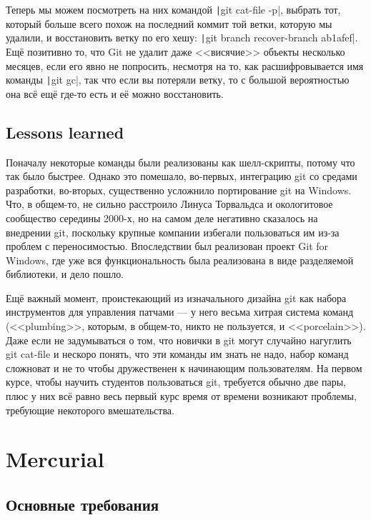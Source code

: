\documentclass[a5paper]{article}
\begin{document}
Теперь мы можем посмотреть на них командой \texttt|git cat-file -p|, выбрать тот, который больше всего похож на последний коммит той ветки, которую мы удалили, и восстановить ветку по его хешу: \texttt|git branch recover-branch ab1afef|. Ещё позитивно то, что Git не удалит даже <<висячие>> объекты несколько месяцев, если его явно не попросить, несмотря на то, как расшифровывается имя команды \texttt|git gc|, так что если вы потеряли ветку, то с большой вероятностью она всё ещё где-то есть и её можно восстановить.

\subsection{Lessons learned}

Поначалу некоторые команды были реализованы как шелл-скрипты, потому что так было быстрее. Однако это помешало, во-первых, интеграцию git со средами разработки, во-вторых, существенно усложнило портирование git на Windows. Что, в общем-то, не сильно расстроило Линуса Торвальдса и окологитовое сообщество середины 2000-х, но на самом деле негативно сказалось на внедрении git, поскольку крупные компании избегали пользоваться им из-за проблем с переносимостью. Впоследствии был реализован проект Git for Windows, где уже вся функциональность была реализована в виде разделяемой библиотеки, и дело пошло.

Ещё важный момент, проистекающий из изначального дизайна git как набора инструментов для управления патчами --- у него весьма хитрая система команд (<<plumbing>>, которым, в общем-то, никто не пользуется, и <<porcelain>>). Даже если не задумываться о том, что новички в git могут случайно нагуглить git cat-file и нескоро понять, что эти команды им знать не надо, набор команд сложноват и не то чтобы дружественен к начинающим пользователям. На первом курсе, чтобы научить студентов пользоваться git, требуется обычно две пары, плюс у них всё равно весь первый курс время от времени возникают проблемы, требующие некоторого вмешательства.

\section{Mercurial}

\subsection{Основные требования}
\end{document}
